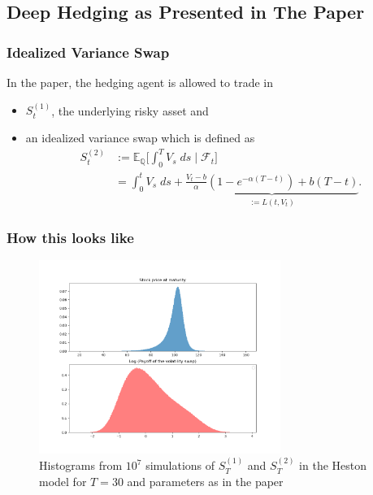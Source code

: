 \documentclass[serif]{beamer}
\def\E{{\mathbb E}}
\def\cF{{\mathcal F}}
\begin{document}
\subsection{Deep Hedging as Presented in The Paper}

\begin{frame}
    \frametitle{Idealized Variance Swap}
    In the paper, the hedging agent is allowed to trade in
    \begin{itemize}
        \item $S^{(1)}_t$, the underlying risky asset and
        \item an idealized variance swap which is defined as
              \begin{align*}
                  S^{(2)}_t & := \E_{\mathbb{Q}} \Big [
                      \int_0^T V_s \; ds \; \Big | \; \cF_t
                  \Big ]                                \\
                            & = \int_0^t V_s \; ds
                  + \underbrace{
                      \frac{V_t - b}{\alpha} (
                      1 - e^{-\alpha(T-t)}
                      ) + b(T-t)
                  }_{:= L(t, V_t)}.
              \end{align*}
    \end{itemize}
\end{frame}

\begin{frame}
    \frametitle{How this looks like}
    \begin{figure}
        \includegraphics[width=0.7\textwidth]{./images/vol_swap_payoff.png}
        \caption{
            Histograms from $10^7$ simulations
            of $S^{(1)}_T$ and $S^{(2)}_T$ in the Heston model
            for $T=30$
            and parameters as in the paper
        }
    \end{figure}
\end{frame}
\end{document}
